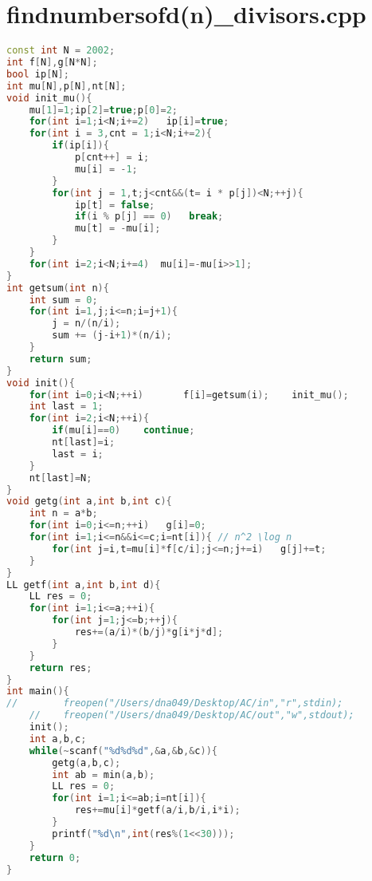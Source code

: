 \section{findnumbersofd(n)_divisors.cpp}
\begin{lstlisting}[language=c++]
const int N = 2002;
int f[N],g[N*N];
bool ip[N];
int mu[N],p[N],nt[N];
void init_mu(){
    mu[1]=1;ip[2]=true;p[0]=2;
    for(int i=1;i<N;i+=2)   ip[i]=true;
    for(int i = 3,cnt = 1;i<N;i+=2){
        if(ip[i]){
            p[cnt++] = i;
            mu[i] = -1;
        }
        for(int j = 1,t;j<cnt&&(t= i * p[j])<N;++j){
            ip[t] = false;
            if(i % p[j] == 0)   break;
            mu[t] = -mu[i];
        }
    }
    for(int i=2;i<N;i+=4)  mu[i]=-mu[i>>1];
}
int getsum(int n){
    int sum = 0;
    for(int i=1,j;i<=n;i=j+1){
        j = n/(n/i);
        sum += (j-i+1)*(n/i);
    }
    return sum;
}
void init(){
    for(int i=0;i<N;++i)       f[i]=getsum(i);    init_mu();
    int last = 1;
    for(int i=2;i<N;++i){
        if(mu[i]==0)    continue;
        nt[last]=i;
        last = i;
    }
    nt[last]=N;
}
void getg(int a,int b,int c){
    int n = a*b;
    for(int i=0;i<=n;++i)   g[i]=0;
    for(int i=1;i<=n&&i<=c;i=nt[i]){ // n^2 \log n
        for(int j=i,t=mu[i]*f[c/i];j<=n;j+=i)   g[j]+=t;
    }
}
LL getf(int a,int b,int d){
    LL res = 0;
    for(int i=1;i<=a;++i){
        for(int j=1;j<=b;++j){
            res+=(a/i)*(b/j)*g[i*j*d];
        }
    }
    return res;
}
int main(){
//        freopen("/Users/dna049/Desktop/AC/in","r",stdin);
    //    freopen("/Users/dna049/Desktop/AC/out","w",stdout);
    init();
    int a,b,c;
    while(~scanf("%d%d%d",&a,&b,&c)){
        getg(a,b,c);
        int ab = min(a,b);
        LL res = 0;
        for(int i=1;i<=ab;i=nt[i]){
            res+=mu[i]*getf(a/i,b/i,i*i);
        }
        printf("%d\n",int(res%(1<<30)));
    }
    return 0;
}

\end{lstlisting}

